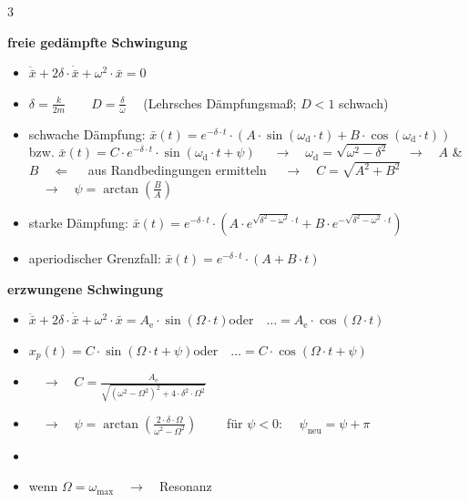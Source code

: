 \documentclass[10pt,a4paper,landscape, hidelinks]{article}
\newcommand*\variant[1]{\bar{#1}}
\begin{document}
\begin{multicols*}{3}
\vspace{20pt}

\textbf{freie gedämpfte Schwingung}
\begin{itemize}[leftmargin=*]
        \item [] $\ddot{\variant{x}}+2\delta\cdot\dot{\variant{x}}+\omega^2\cdot\variant{x}=0$
        \item [] $\delta=\frac{k}{2m}\qquad D=\frac{\delta}{\omega}\quad$ {\scriptsize(Lehrsches Dämpfungsmaß; $D<1$ schwach)}
        \item [] schwache Dämpfung: 
        \subitem $\variant{x}(t)=e^{-\delta\cdot t}\cdot\left( A\cdot\sin(\omega_\text{d}\cdot t)+B\cdot\cos(\omega_\text{d}\cdot t)\right)$
        \subitem \tabto{1.8cm}bzw.
        \subitem $\variant{x}(t)=C\cdot e^{-\delta\cdot t}\cdot\sin(\omega_\text{d}\cdot t+\psi)$
        \subitem $\quad\longrightarrow\quad\omega_\text{d}=\sqrt{\omega^2-\delta^2}$
        \subitem $\quad\longrightarrow\quad A$ \& $B\quad\Leftarrow\quad$ aus Randbedingungen ermitteln
        \subitem $\quad\longrightarrow\quad C=\sqrt{A^2+B^2}$
        \subitem $\quad\longrightarrow\quad\psi=\arctan\left(\frac{B}{A}\right)$
        \item [] starke Dämpfung: 
        \subitem $\variant{x}(t)=e^{-\delta\cdot t}\cdot\left(A\cdot e^{\sqrt{\delta^2-\omega^2}\cdot t}+B\cdot e^{-\sqrt{\delta^2-\omega^2}\cdot t}\right)$
        \item [] aperiodischer Grenzfall: 
        \subitem $\variant{x}(t)=e^{-\delta\cdot t}\cdot(A+B\cdot t)$
\end{itemize}

\par\vspace{150pt}\null
\columnbreak

\textbf{erzwungene Schwingung}
\begin{itemize}[leftmargin=*]
        \item [] $\ddot{\variant{x}}+2\delta\cdot\dot{\variant{x}}+\omega^2\cdot\variant{x}=A_\text{e}\cdot\sin(\Omega\cdot t)$\tabto{5.1cm}oder$\quad\dots=A_\text{e}\cdot\cos(\Omega\cdot t)$
        \item [] $x_p(t)=C\cdot\sin(\Omega\cdot t+\psi)$\tabto{5.1cm}oder$\quad\dots=C\cdot\cos(\Omega\cdot t+\psi)$
        \item [] $\quad\longrightarrow\quad C=\frac{A_\text{e}}{\sqrt{(\omega^2-\Omega^2)^2+4\cdot\delta^2\cdot\Omega^2}}$
        \item [] $\quad\longrightarrow\quad\psi=\arctan(\frac{2\cdot\delta\cdot\Omega}{\omega^2-\Omega^2})\qquad$ für $\psi<0$: $\quad\psi_\text{neu}=\psi+\pi$
        \item [] 
        \item [] {\scriptsize wenn $\Omega=\omega_\text{max}\quad\rightarrow\quad$Resonanz}
\end{itemize}


\end{multicols*}
\end{document}
